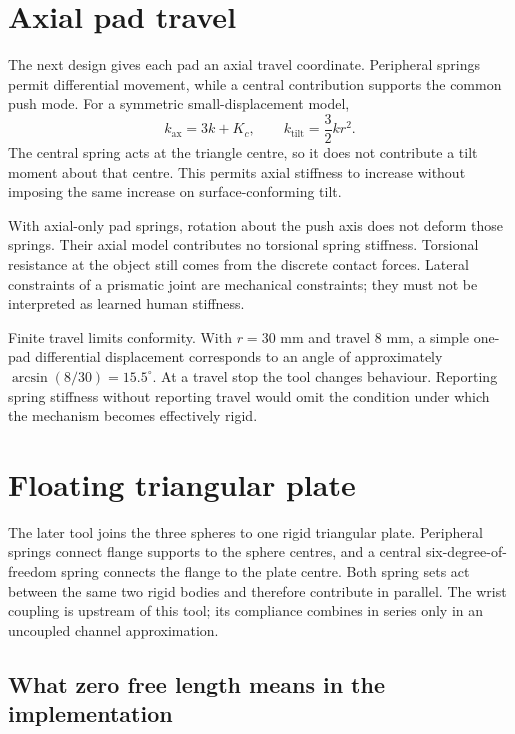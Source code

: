\section{Axial pad travel}

The next design gives each pad an axial travel coordinate. Peripheral springs permit differential movement, while a central contribution supports the common push mode. For a symmetric small-displacement model,
\begin{equation}
k_{\mathrm{ax}}=3k+K_c,\qquad
k_{\mathrm{tilt}}=\frac32kr^2.
\label{eq:rail-stiffness}
\end{equation}
The central spring acts at the triangle centre, so it does not contribute a tilt moment about that centre. This permits axial stiffness to increase without imposing the same increase on surface-conforming tilt.

With axial-only pad springs, rotation about the push axis does not deform those springs. Their axial model contributes no torsional spring stiffness. Torsional resistance at the object still comes from the discrete contact forces. Lateral constraints of a prismatic joint are mechanical constraints; they must not be interpreted as learned human stiffness.

Finite travel limits conformity. With $r=30$ mm and travel $8$ mm, a simple one-pad differential displacement corresponds to an angle of approximately $\arcsin(8/30)=15.5^\circ$. At a travel stop the tool changes behaviour. Reporting spring stiffness without reporting travel would omit the condition under which the mechanism becomes effectively rigid.

\section{Floating triangular plate}
\label{sec:floating-plate}

The later tool joins the three spheres to one rigid triangular plate. Peripheral springs connect flange supports to the sphere centres, and a central six-degree-of-freedom spring connects the flange to the plate centre. Both spring sets act between the same two rigid bodies and therefore contribute in parallel. The wrist coupling is upstream of this tool; its compliance combines in series only in an uncoupled channel approximation.

\subsection{What zero free length means in the implementation}
\label{sec:plate-zero-length}

